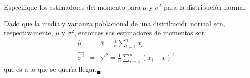 \begin{enunciado}
 Especifique los estimadores del momento para $\mu$ y $\sigma^2$ para la distribuci\'on normal.
\end{enunciado}

\begin{solucion}
 Dado que la media y varianza poblacional de una distribuci\'on normal son, respectivamente, $\mu$ y $\sigma^2$, entonces sus estimadores de momentos son:
 \begin{eqnarray*}
  \widehat{\mu} & = & \bar{x} = \frac{1}{n} \sum_{i=1}^n x_i \\
  \widehat{\sigma^2} & = & s'^2 = \frac{1}{n} \sum_{i=1}^n \left( x_i - \bar{x} \right)^2
 \end{eqnarray*}
 que es a lo que se quer\'{\i}a llegar.${}_{\blacksquare}$
\end{solucion}
